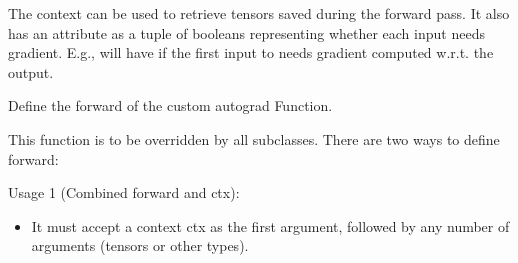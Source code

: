 \documentclass[letterpaper,10pt,english]{sphinxmanual}
\begin{document}
\begin{fulllineitems}
\begin{fulllineitems}
\sphinxAtStartPar
The context can be used to retrieve tensors saved during the forward
pass. It also has an attribute  as a tuple
of booleans representing whether each input needs gradient. E.g.,
{\hyperref[\detokenize{index:hypyml.models.Physics.backward}]{}} will have  if the
first input to {\hyperref[\detokenize{index:hypyml.models.Physics.forward}]{}} needs gradient computed w.r.t. the
output.

\end{fulllineitems}


\begin{fulllineitems}
\label{\detokenize{index:hypyml.models.Physics.forward}}
\pysigstartsignatures
{}
\pysigstopsignatures
\sphinxAtStartPar
Define the forward of the custom autograd Function.

\sphinxAtStartPar
This function is to be overridden by all subclasses.
There are two ways to define forward:

\sphinxAtStartPar
Usage 1 (Combined forward and ctx):

\begin{sphinxVerbatim}[commandchars=\\\{\}]
        
\end{sphinxVerbatim}
\begin{itemize}
\item {} 
\sphinxAtStartPar
It must accept a context ctx as the first argument, followed by any
number of arguments (tensors or other types).


\end{itemize}
\end{fulllineitems}
\end{fulllineitems}
\end{document}
